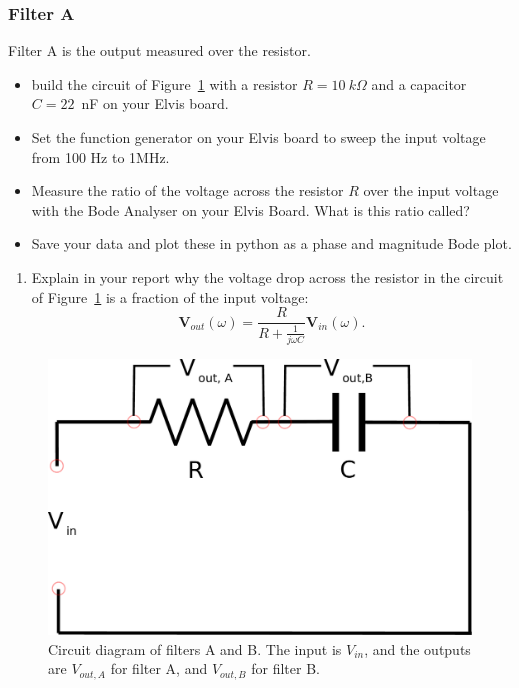 \documentclass{article}
\begin{document}
\subsubsection*{Filter A}
Filter A is the output measured over the resistor.
\begin{itemize}
\item build the circuit of Figure~\ref{fig:filterAB} with a resistor
  $R=10~k\Omega$ and a capacitor $C=22$~nF on your Elvis board.
\item Set the function generator on your Elvis board to sweep the
  input voltage from 100 Hz to 1MHz. 
\item Measure the ratio of the voltage across the resistor $R$ over
  the input voltage with the Bode Analyser on your Elvis Board. What
  is this ratio called?
\item Save your data and plot these in python as a phase and
  magnitude Bode plot.
\end{itemize}

\begin{enumerate}
\item Explain in your report why the voltage drop across the resistor
  in the circuit of Figure~\ref{fig:filterAB} is a fraction of the
  input voltage:
  $$\mathbf{V}_{out}(\omega)=
  \frac{R}{R+{\frac {1}{j\omega C}}}\mathbf{V}_{in}(\omega).$$
\end{enumerate}
\begin{figure}
  \centering
  \includegraphics[width=0.5\columnwidth]{images/RCfilter}
  \caption{Circuit diagram of filters A and B. The input is $V_{in}$,
    and the outputs are $V_{out,A}$ for filter A, and $V_{out,B}$ for
    filter B.}
  \label{fig:filterAB}
\end{figure}
\end{document}
